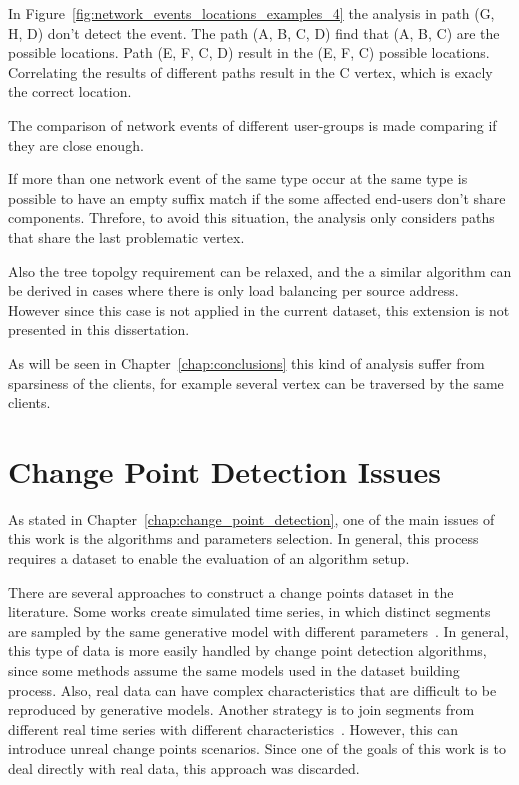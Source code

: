 In Figure~\ref{fig:network_events_locations_examples_4} the analysis in path
(G, H, D) don't detect the event. The path (A, B, C, D) find that (A, B, C) are
the possible locations. Path (E, F, C, D) result in the (E, F, C) possible
locations. Correlating the results of different paths result in the C vertex,
which is exacly the correct location.

The comparison of network events of different user-groups is made comparing if
they are close enough.

If more than one network event of the same type occur at the same type is
possible to have an empty suffix match if the some affected end-users don't
share components. Threfore, to avoid this situation, the analysis only
considers paths that share the last problematic vertex.

Also the tree topolgy requirement can be relaxed, and the a similar algorithm
can be derived in cases where there is only load balancing per source address.
However since this case is not applied in the current dataset, this extension
is not presented in this dissertation.

As will be seen in Chapter~\ref{chap:conclusions} this kind of analysis suffer
from sparsiness of the clients, for example several vertex can be traversed by
the same clients.

\section{Change Point Detection Issues}

As stated in Chapter~\ref{chap:change_point_detection}, one of the main issues
of this work is the algorithms and parameters selection.
In general, this process requires a dataset to enable the evaluation of an
algorithm setup.

There are several approaches to construct a
change points dataset in the literature.
Some works create simulated time series, in which distinct segments are sampled
by the same generative model with different
parameters~\cite{change_point_detection_in_time_series_data_by_relative_density_ratio_estimation}.
In general, this type of data is more easily handled by change point detection
algorithms, since some methods assume the same models used in the dataset
building process. Also, real data can have complex characteristics that are
difficult to be reproduced by generative models. Another strategy is to join
segments from different real time series with different
characteristics~\cite{inertial_hidden_markov_models_modeling_change_in_multivariate_time_series}.
However, this can introduce unreal change points scenarios. Since one of
the goals of this work is to deal directly with real data,
this approach was discarded.

